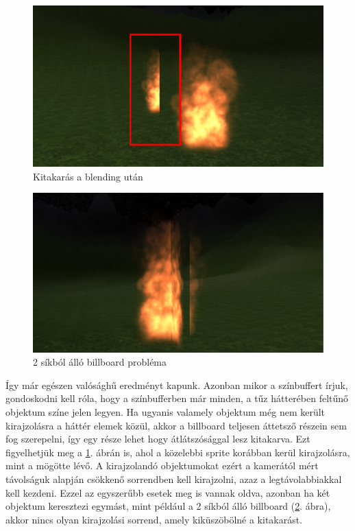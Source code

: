 \begin{figure}[h]
 \centering
 \includegraphics[width=\textwidth]{kepek/billboardOverlap.png}
 \caption{Kitakarás a blending után}
 \label{fig:billboardOverlap}
\end{figure}
\begin{figure}[h!]
 \centering
 \includegraphics[width=\textwidth]{kepek/doubleBillboard1.png}
 \caption{2 síkból álló billboard probléma}
 \label{fig:doubleBillboard}
\end{figure}

Így már egészen valósághű eredményt kapunk. Azonban mikor a színbuffert írjuk, gondoskodni kell róla, hogy a színbufferben már minden, a tűz hátterében feltűnő objektum színe jelen legyen.
 Ha ugyanis valamely objektum még nem került kirajzolásra a háttér elemek közül, akkor a billboard teljesen áttetsző részein sem fog szerepelni, így egy része lehet hogy átlátszósággal lesz kitakarva. Ezt figyelhetjük meg a \ref{fig:billboardOverlap}. ábrán is, ahol a közelebbi sprite korábban kerül kirajzolásra, mint a mögötte lévő. A kirajzolandó objektumokat ezért a kamerától mért távolságuk alapján csökkenő sorrendben kell kirajzolni, azaz a legtávolabbiakkal kell kezdeni. Ezzel az egyszerűbb esetek meg is vannak oldva, azonban ha két objektum keresztezi egymást, mint például a 2 síkból álló billboard (\ref{fig:doubleBillboard}. ábra), akkor nincs olyan kirajzolási sorrend, amely kiküszöbölné a kitakarást. 

